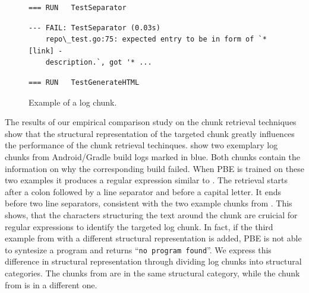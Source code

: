 \begin{figure}[!t]
  \centering
  \begin{lstlisting}[breaklines=true,frame=tlr]
=== RUN   TestSeparator
  \end{lstlisting}
  \vspace{-\baselineskip}
  \begin{lstlisting}[backgroundcolor=\color{Cerulean!60},breaklines=true,frame=rl]
--- FAIL: TestSeparator (0.03s)
    repo\_test.go:75: expected entry to be in form of `* [link] -
    description.`, got '* ...
  \end{lstlisting}
  \vspace{-\baselineskip}
  \begin{lstlisting}[breaklines=true,frame=blr]
=== RUN   TestGenerateHTML
  \end{lstlisting}
  \caption{Example of a log chunk.
}
  \label{lst:chunk-example-3}
\end{figure}

The results of our empirical comparison study on the chunk retrieval
techniques
show that the structural representation of the targeted chunk greatly
influences
the performance of the chunk retrieval techinques.
 show two exemplary
log chunks
from Android/Gradle build logs marked in blue.
Both chunks contain the information on why the
corresponding build failed.
When PBE is trained on these two examples it produces
a regular expression similar to .
The retrieval
starts after a colon followed by a line separator and before a capital
letter.
It ends before two line separators, consistent with the two example
chunks from
.
This shows, that the characters structuring the text around the chunk are
cruicial for regular expressions to identify the targeted log chunk.
In fact, if the third
example from  with a different structural
representation is added, PBE is not able to syntesize a program and
returns
``\texttt{no program found}''.
We express this difference in structural representation through
dividing log
chunks into structural categories.
The chunks from
 are in the same structural
category, while the chunk from  is in a
different one.


